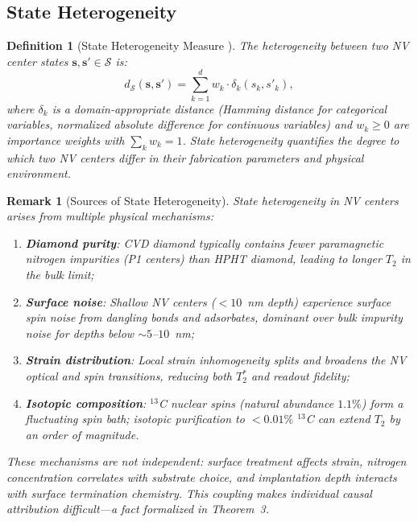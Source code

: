 \documentclass[11pt,a4paper]{article}
\newtheorem{definition}[theorem]{Definition}
\newtheorem{remark}[theorem]{Remark}
\theoremstyle{definition}
\newcommand{\cS}{\mathcal{S}}
\newcommand{\Ttwo}{T_2}
\newcommand{\TtwoStar}{T_2^*}
\newcommand{\NV}{NV}
\begin{document}
\subsection{State Heterogeneity}

\begin{definition}[State Heterogeneity Measure ]
\label{def:heterogeneity}
The heterogeneity between two \NV{} center states $\mathbf{s}, \mathbf{s}' \in \cS$ is:
\begin{equation}
    d_{\cS}(\mathbf{s}, \mathbf{s}') = \sum_{k=1}^{d} w_k \cdot \delta_k(s_k, s'_k),
    \label{eq:heterogeneity}
\end{equation}
where $\delta_k$ is a domain-appropriate distance (Hamming distance for categorical
variables, normalized absolute difference for continuous variables) and
$w_k \geq 0$ are importance weights with $\sum_k w_k = 1$. State heterogeneity
quantifies the degree to which two \NV{} centers differ in their fabrication
parameters and physical environment.
\end{definition}

\begin{remark}[Sources of State Heterogeneity]
State heterogeneity in \NV{} centers arises from multiple physical mechanisms:
\begin{enumerate}[nosep]
    \item \textbf{Diamond purity}: CVD diamond typically contains fewer
    paramagnetic nitrogen impurities (P1 centers) than HPHT diamond,
    leading to longer $\Ttwo$ in the bulk limit;
    \item \textbf{Surface noise}: Shallow \NV{} centers ($<10$~nm depth)
    experience surface spin noise from dangling bonds and adsorbates,
    dominant over bulk impurity noise for depths below $\sim 5$--$10$~nm;
    \item \textbf{Strain distribution}: Local strain inhomogeneity splits
    and broadens the \NV{} optical and spin transitions, reducing both
    $\TtwoStar$ and readout fidelity;
    \item \textbf{Isotopic composition}: ${}^{13}$C nuclear spins (natural
    abundance $1.1\%$) form a fluctuating spin bath; isotopic purification
    to $<0.01\%$ ${}^{13}$C can extend $\Ttwo$ by an order of magnitude.
\end{enumerate}
These mechanisms are \textit{not independent}: surface treatment affects strain,
nitrogen concentration correlates with substrate choice, and implantation
depth interacts with surface termination chemistry. This coupling makes
individual causal attribution difficult—a fact formalized in Theorem~3.
\end{remark}
\end{document}
